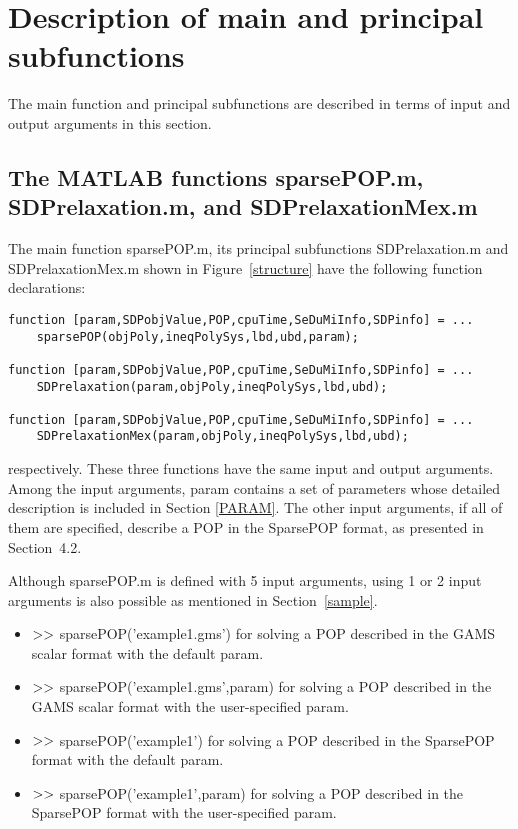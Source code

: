 \section{Description of main and principal subfunctions}
\label{mainFunctions}

The main function and principal subfunctions are described in terms of input and output
arguments in this section. 

\subsection{The MATLAB functions sparsePOP.m, SDPrelaxation.m, and SDPrelaxationMex.m} 


The main function sparsePOP.m, its principal subfunctions SDPrelaxation.m 
and SDPrelaxationMex.m  shown in Figure~\ref{structure} 
have the following function declarations: 
\begin{verbatim}
function [param,SDPobjValue,POP,cpuTime,SeDuMiInfo,SDPinfo] = ...
    sparsePOP(objPoly,ineqPolySys,lbd,ubd,param); 

function [param,SDPobjValue,POP,cpuTime,SeDuMiInfo,SDPinfo] = ...
    SDPrelaxation(param,objPoly,ineqPolySys,lbd,ubd);

function [param,SDPobjValue,POP,cpuTime,SeDuMiInfo,SDPinfo] = ...
    SDPrelaxationMex(param,objPoly,ineqPolySys,lbd,ubd);
\end{verbatim}
respectively. These three functions have the same input and output 
arguments. Among the input arguments, {\sf param} contains a set of parameters
whose detailed description is included in Section \ref{PARAM}. 
The other input arguments, if all of them are specified,   describe a POP 
in the SparsePOP format, as presented in Section~4.2. 

Although sparsePOP.m is defined with 5 input arguments, using 1 or 2 input arguments
is also possible as mentioned in Section~\ref{sample}. 
\begin{itemize}
\item ${\bf >>}$ {\sf sparsePOP('example1.gms')} for solving a POP described in the GAMS scalar format 
with the default {\sf param}. 
\item ${\bf >>}$ {\sf sparsePOP('example1.gms',param)} for solving a POP described in the GAMS scalar 
format with the user-specified {\sf param}. 
\item ${\bf >>}$ {\sf sparsePOP('example1')} for solving a POP described in the SparsePOP  format with 
the default {\sf param}. 
\item ${\bf >>}$ {\sf sparsePOP('example1',param)} for solving a POP described in the SparsePOP format 
with the user-specified {\sf param}. 
\end{itemize}

